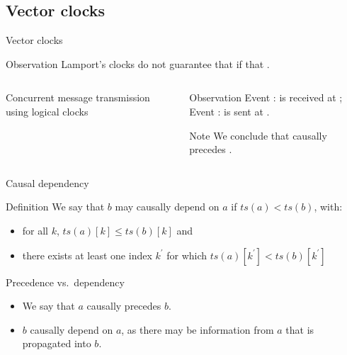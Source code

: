 \subsection{Vector clocks}
\begin{slide}{Vector clocks}
  \begin{block}{Observation}
    Lamport's clocks do not guarantee that if  that   .
  \end{block}
  \begin{columns}[T]
    \begin{column}{0.45\textwidth}
      \begin{block}{Concurrent message transmission using logical clocks}
        \begin{centerfig}
        \end{centerfig}
      \end{block}
    \end{column}
    \begin{column}{0.5\textwidth}
      \begin{block}{Observation}
        Event :  is received at ; \newline
        Event :  is sent at .
      \end{block}
      \begin{alertblock}{Note}
        We  conclude that  causally precedes .
      \end{alertblock}
    \end{column}
  \end{columns}
\end{slide}
\begin{slide}{Causal dependency}
  \begin{block}{Definition}
    We say that $b$ may causally depend on $a$ if $ts(a) < ts(b)$, with:
    \begin{itemize}
    \item for all $k$, $ts(a)[k] \leq ts(b)[k]$ and
    \item there exists at least one index $k^{\prime}$ for which $ts(a)[k^{\prime}] < ts(b)[k^{\prime}]$ 
    \end{itemize}
  \end{block}
  \begin{block}{Precedence vs.\ dependency}
    \begin{itemize}
      \item We say that $a$ causally precedes $b$.
      \item $b$  causally depend on $a$, as there may be information from $a$ that is propagated into
        $b$.
    \end{itemize}
  \end{block}
\end{slide}
